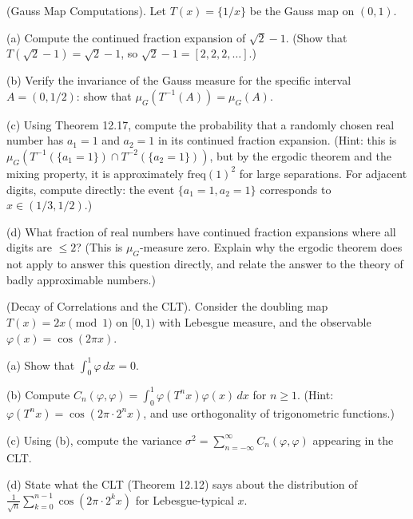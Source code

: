 \begin{exercise}
(Gauss Map Computations). Let $T(x) = \{1/x\}$ be the Gauss map on $(0, 1)$.

(a) Compute the continued fraction expansion of $\sqrt{2} - 1$. (Show that $T(\sqrt{2}-1) = \sqrt{2}-1$, so $\sqrt{2}-1 = [2, 2, 2, \ldots]$.)

(b) Verify the invariance of the Gauss measure for the specific interval $A = (0, 1/2)$: show that $\mu_G(T^{-1}(A)) = \mu_G(A)$.

(c) Using Theorem 12.17, compute the probability that a randomly chosen real number has $a_1 = 1$ and $a_2 = 1$ in its continued fraction expansion. (Hint: this is $\mu_G(T^{-1}(\{a_1 = 1\}) \cap T^{-2}(\{a_2 = 1\}))$, but by the ergodic theorem and the mixing property, it is approximately $\text{freq}(1)^2$ for large separations. For adjacent digits, compute directly: the event $\{a_1 = 1, a_2 = 1\}$ corresponds to $x \in (1/3, 1/2)$.)

(d) What fraction of real numbers have continued fraction expansions where all digits are $\leq 2$? (This is $\mu_G$-measure zero. Explain why the ergodic theorem does not apply to answer this question directly, and relate the answer to the theory of badly approximable numbers.)


\bigskip

\end{exercise}


\begin{exercise}
(Decay of Correlations and the CLT). Consider the doubling map $T(x) = 2x \pmod{1}$ on $[0,1)$ with Lebesgue measure, and the observable $\varphi(x) = \cos(2\pi x)$.

(a) Show that $\int_0^1 \varphi \, dx = 0$.

(b) Compute $C_n(\varphi, \varphi) = \int_0^1 \varphi(T^n x) \varphi(x) \, dx$ for $n \geq 1$. (Hint: $\varphi(T^n x) = \cos(2\pi \cdot 2^n x)$, and use orthogonality of trigonometric functions.)

(c) Using (b), compute the variance $\sigma^2 = \sum_{n=-\infty}^{\infty} C_n(\varphi, \varphi)$ appearing in the CLT.

(d) State what the CLT (Theorem 12.12) says about the distribution of $\frac{1}{\sqrt{n}}\sum_{k=0}^{n-1}\cos(2\pi \cdot 2^k x)$ for Lebesgue-typical $x$.


\bigskip

\end{exercise}


